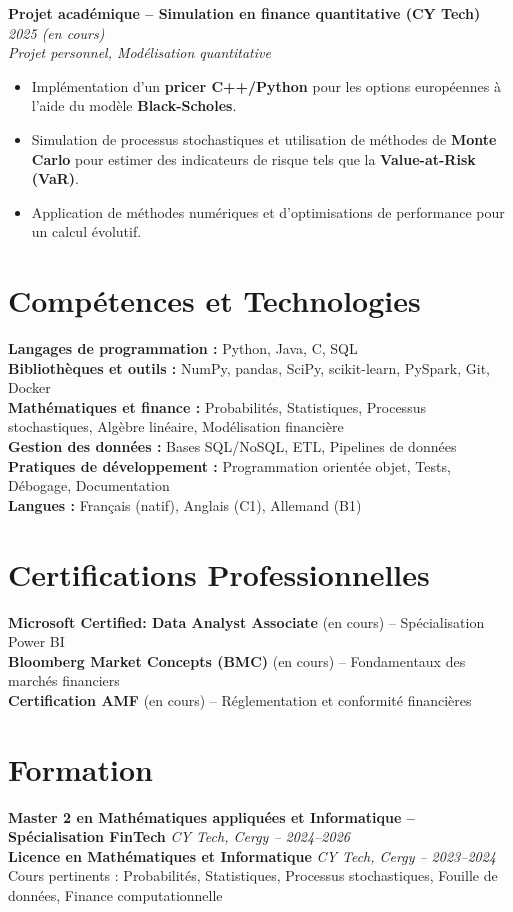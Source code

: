 \documentclass[10pt, letterpaper]{article}
\begin{document}
\vspace{0.2cm}

\textbf{Projet académique – Simulation en finance quantitative (CY Tech)} \hfill \textit{2025 (en cours)}\\
\textit{Projet personnel, Modélisation quantitative}
\begin{itemize}
    \item Implémentation d’un \textbf{pricer C++/Python} pour les options européennes à l’aide du modèle \textbf{Black-Scholes}.
    \item Simulation de processus stochastiques et utilisation de méthodes de \textbf{Monte Carlo} pour estimer des indicateurs de risque tels que la \textbf{Value-at-Risk (VaR)}.
    \item Application de méthodes numériques et d’optimisations de performance pour un calcul évolutif.
\end{itemize}

\section*{Compétences et Technologies}

\textbf{Langages de programmation :} Python, Java, C, SQL\\
\textbf{Bibliothèques et outils :} NumPy, pandas, SciPy, scikit-learn, PySpark, Git, Docker\\
\textbf{Mathématiques et finance :} Probabilités, Statistiques, Processus stochastiques, Algèbre linéaire, Modélisation financière\\
\textbf{Gestion des données :} Bases SQL/NoSQL, ETL, Pipelines de données\\
\textbf{Pratiques de développement :} Programmation orientée objet, Tests, Débogage, Documentation\\
\textbf{Langues :} Français (natif), Anglais (C1), Allemand (B1)

\section*{Certifications Professionnelles}

\textbf{Microsoft Certified: Data Analyst Associate} (en cours) – Spécialisation Power BI\\
\textbf{Bloomberg Market Concepts (BMC)} (en cours) – Fondamentaux des marchés financiers\\
\textbf{Certification AMF} (en cours) – Réglementation et conformité financières

\section*{Formation}
\textbf{Master 2 en Mathématiques appliquées et Informatique – Spécialisation FinTech} \hfill \textit{CY Tech, Cergy – 2024–2026}\\
\textbf{Licence en Mathématiques et Informatique} \hfill \textit{CY Tech, Cergy – 2023–2024}\\
Cours pertinents : Probabilités, Statistiques, Processus stochastiques, Fouille de données, Finance computationnelle
\end{document}
